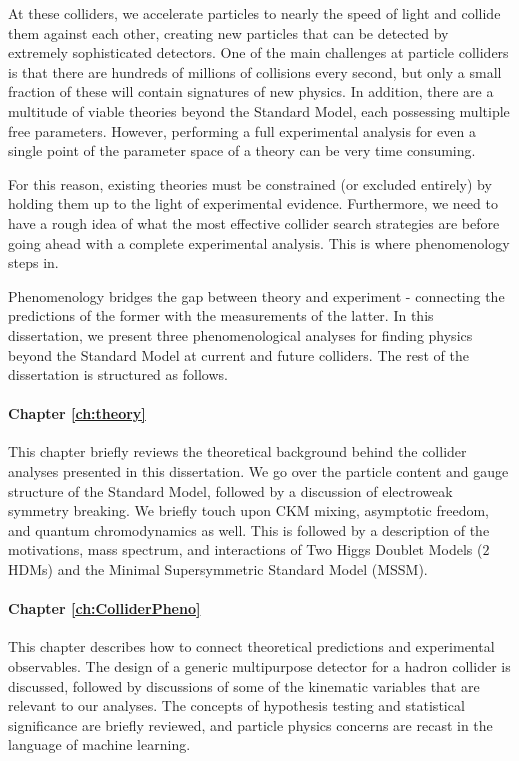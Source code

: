 At these colliders, we accelerate particles to nearly the speed of light and collide them against each other, creating new particles that can be detected by extremely sophisticated detectors. One of the main challenges at particle colliders is that there are hundreds of millions of collisions every second, but only a small fraction of these will contain signatures of new physics. In addition, there are a multitude of viable theories beyond the Standard Model, each possessing multiple free parameters. However, performing a full experimental analysis for even a single point of the parameter space of a theory can be very time consuming.

For this reason, existing theories must be constrained (or excluded entirely) by holding them up to the light of experimental evidence. Furthermore, we need to have a rough idea of what the most effective collider search strategies are before going ahead with a complete experimental analysis. This is where phenomenology steps in.

Phenomenology bridges the gap between theory and experiment - connecting the predictions of the former with the measurements of the latter. In this dissertation, we present three phenomenological analyses for finding physics beyond the Standard Model at current and future colliders. The rest of the dissertation is structured as follows.

\paragraph{Chapter \ref{ch:theory}} This chapter briefly reviews the theoretical background behind the collider analyses presented in this dissertation. We go over the particle content and gauge structure of the Standard Model, followed by a discussion of electroweak symmetry breaking. We briefly touch upon CKM mixing, asymptotic freedom, and quantum chromodynamics as well. This is followed by a description of the motivations, mass spectrum, and interactions of Two Higgs Doublet Models ($2$HDMs) and the Minimal Supersymmetric Standard Model (MSSM).

\paragraph{Chapter \ref{ch:ColliderPheno}} This chapter describes how to connect theoretical predictions and experimental observables. The design of a generic multipurpose detector for a hadron collider is discussed, followed by discussions of some of the kinematic variables that are relevant to our analyses. The concepts of hypothesis testing and statistical significance are briefly reviewed, and particle physics concerns are recast in the language of machine learning.

